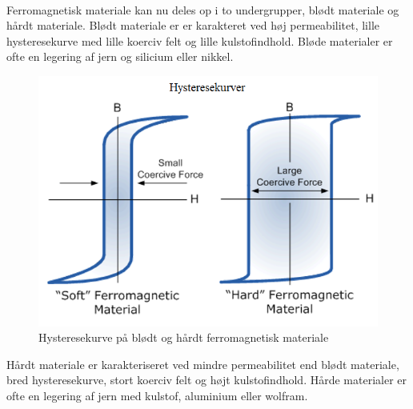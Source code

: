   \\
Ferromagnetisk materiale kan nu deles op i to undergrupper, blødt materiale og hårdt materiale. Blødt materiale er er karakteret ved høj permeabilitet, lille hysteresekurve med lille koerciv felt og lille kulstofindhold. Bløde materialer er ofte en legering af jern og silicium eller nikkel.\\
\begin{figure}
\includegraphics[scale=0.4]{./Graphics/Hysteresekurver}
\caption{Hysteresekurve på blødt og hårdt ferromagnetisk materiale}
\label{Hysteresekurve}
\end{figure}
Hårdt materiale er karakteriseret ved mindre permeabilitet end blødt materiale, bred hysteresekurve, stort koerciv felt og højt kulstofindhold. Hårde materialer er ofte en legering af jern med kulstof, aluminium eller wolfram. 

